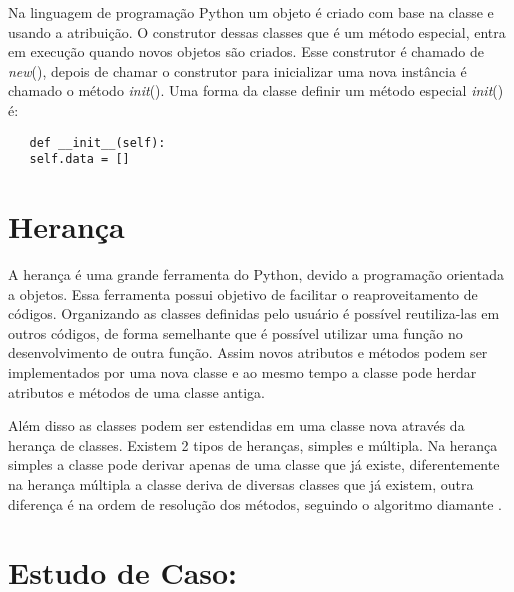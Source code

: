 	 Na linguagem de programação Python um objeto é criado com base na classe e usando a atribuição. O construtor dessas classes que é um método especial, entra em execução quando novos objetos são criados. Esse construtor é chamado de \textunderscore\textunderscore \textit{new}\textunderscore\textunderscore(), depois de chamar o construtor para inicializar uma nova instância é chamado o método \textunderscore\textunderscore \textit{init}\textunderscore\textunderscore(). Uma forma da classe definir um método especial \textunderscore\textunderscore \textit{init}\textunderscore\textunderscore() é:
	 \begin{lstlisting}
   def __init__(self):
   self.data = []
	 \end{lstlisting}
	 
	
    \section{Herança}
	A herança é uma grande ferramenta do Python, devido a programação orientada a objetos. Essa ferramenta possui objetivo de facilitar o reaproveitamento de códigos. Organizando as classes definidas pelo usuário é possível reutiliza-las em outros códigos, de forma semelhante que é possível utilizar uma função no desenvolvimento de outra função. Assim novos atributos e métodos podem ser implementados por uma nova classe e ao mesmo tempo a classe pode herdar atributos e métodos de uma classe antiga. 
	
	Além disso as classes podem ser estendidas em uma classe nova através da herança de classes. Existem 2 tipos de heranças, simples e múltipla. Na herança simples a classe pode derivar apenas de uma classe que já existe, diferentemente na herança múltipla a classe deriva de diversas classes que já existem, outra diferença é na ordem de resolução dos métodos, seguindo o algoritmo diamante \cite{Borges2014}.

    \section{Estudo de Caso: }
